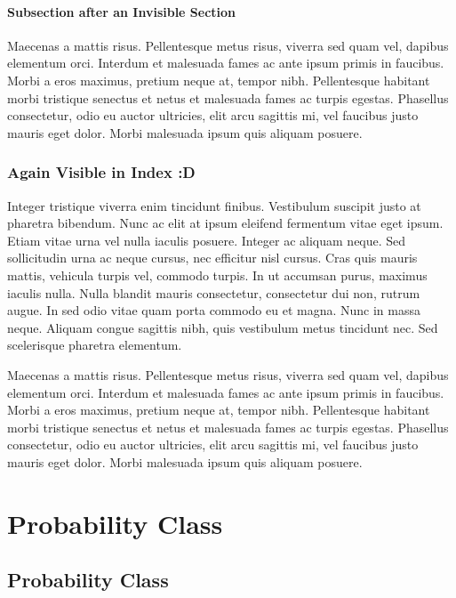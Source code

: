 \documentclass[11pt,letterpaper]{book}
\begin{document}
\subsection{Subsection after an Invisible Section}
\noindent Maecenas a mattis risus. Pellentesque metus risus, viverra sed quam vel, dapibus elementum orci. Interdum et malesuada fames ac ante ipsum primis in faucibus. Morbi a eros maximus, pretium neque at, tempor nibh. Pellentesque habitant morbi tristique senectus et netus et malesuada fames ac turpis egestas. Phasellus consectetur, odio eu auctor ultricies, elit arcu sagittis mi, vel faucibus justo mauris eget dolor. Morbi malesuada ipsum quis aliquam posuere. 

\section{Again Visible in Index :D}
\noindent  Integer tristique viverra enim tincidunt finibus. Vestibulum suscipit justo at pharetra bibendum. Nunc ac elit at ipsum eleifend fermentum vitae eget ipsum. Etiam vitae urna vel nulla iaculis posuere. Integer ac aliquam neque. Sed sollicitudin urna ac neque cursus, nec efficitur nisl cursus. Cras quis mauris mattis, vehicula turpis vel, commodo turpis. In ut accumsan purus, maximus iaculis nulla. Nulla blandit mauris consectetur, consectetur dui non, rutrum augue. In sed odio vitae quam porta commodo eu et magna. Nunc in massa neque. Aliquam congue sagittis nibh, quis vestibulum metus tincidunt nec. Sed scelerisque pharetra elementum.

Maecenas a mattis risus. Pellentesque metus risus, viverra sed quam vel, dapibus elementum orci. Interdum et malesuada fames ac ante ipsum primis in faucibus. Morbi a eros maximus, pretium neque at, tempor nibh. Pellentesque habitant morbi tristique senectus et netus et malesuada fames ac turpis egestas. Phasellus consectetur, odio eu auctor ultricies, elit arcu sagittis mi, vel faucibus justo mauris eget dolor. Morbi malesuada ipsum quis aliquam posuere. 









\part{Probability Class}

\chapter{Probability Class}
\end{document}
